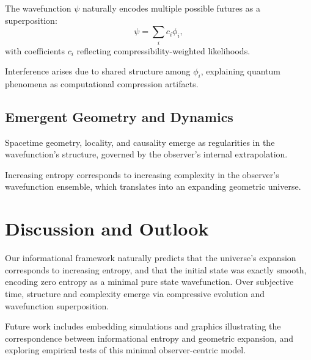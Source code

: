 \documentclass[12pt]{article}
\begin{document}
The wavefunction \(\psi\) naturally encodes multiple possible futures as a superposition:
\[
      \psi = \sum_i c_i \phi_i,
\]
with coefficients \(c_i\) reflecting compressibility-weighted likelihoods.

Interference arises due to shared structure among \(\phi_i\), explaining quantum phenomena as computational compression artifacts.

\subsection{Emergent Geometry and Dynamics}

Spacetime geometry, locality, and causality emerge as regularities in the wavefunction's structure, governed by the observer’s internal extrapolation.

Increasing entropy corresponds to increasing complexity in the observer's wavefunction ensemble, which translates into an expanding geometric universe.

\section{Discussion and Outlook}

Our informational framework naturally predicts that the universe's expansion corresponds to increasing entropy, and that the initial state was exactly smooth, encoding zero entropy as a minimal pure state wavefunction. Over subjective time, structure and complexity emerge via compressive evolution and wavefunction superposition.

Future work includes embedding simulations and graphics illustrating the correspondence between informational entropy and geometric expansion, and exploring empirical tests of this minimal observer-centric model.
\end{document}

